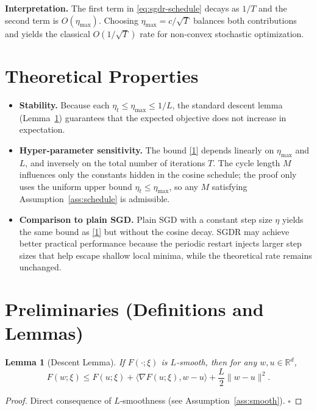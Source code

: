 \documentclass{article}
\newtheorem{lemma}{Lemma}
\newcommand{\R}{\mathbb{R}}
\begin{document}
\bigskip
\noindent\textbf{Interpretation.}  
The first term in \eqref{eq:sgdr-schedule} decays as $1/T$ and the second term is $O(\eta_{\max})$. Choosing $\eta_{\max}=c/\sqrt{T}$ balances both contributions and yields the classical $O(1/\sqrt{T})$ rate for non‑convex stochastic optimization.

\section*{Theoretical Properties}
\begin{itemize}
\item \textbf{Stability.} Because each $\eta_t\le\eta_{\max}\le 1/L$, the standard descent lemma (Lemma~\ref{lem:descent}) guarantees that the expected objective does not increase in expectation.
\item \textbf{Hyper‑parameter sensitivity.} The bound \eqref{1} depends linearly on $\eta_{\max}$ and $L$, and inversely on the total number of iterations $T$. The cycle length $M$ influences only the constants hidden in the cosine schedule; the proof only uses the uniform upper bound $\eta_t\le\eta_{\max}$, so any $M$ satisfying Assumption~\ref{ass:schedule} is admissible.
\item \textbf{Comparison to plain SGD.} Plain SGD with a constant step size $\eta$ yields the same bound as \eqref{1} but without the cosine decay. SGDR may achieve better practical performance because the periodic restart injects larger step sizes that help escape shallow local minima, while the theoretical rate remains unchanged.
\end{itemize}

\section*{Preliminaries (Definitions and Lemmas)}
\begin{lemma}[Descent Lemma]\label{lem:descent}
If $F(\cdot;\xi)$ is $L$‑smooth, then for any $w,u\in\R^d$,
\[
F(w;\xi) \le F(u;\xi) + \langle\nabla F(u;\xi),w-u\rangle +\frac{L}{2}\|w-u\|^2 .
\]
\end{lemma}
\begin{proof}
Direct consequence of $L$‑smoothness (see Assumption~\ref{ass:smooth}). \hfill $\square$
\end{proof}
\end{document}
